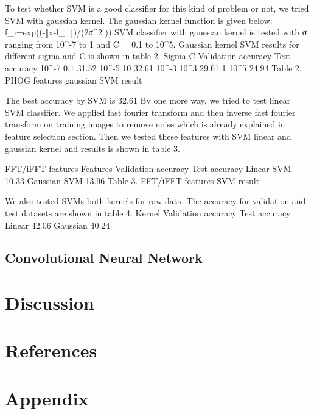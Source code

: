 \documentclass[10pt,twocolumn]{article}
\begin{document}
To test whether SVM is a good classifier for this kind of problem or not, we tried SVM with gaussian kernel. The gaussian kernel function is given below:
f_i=exp⁡((-‖x-l_i ‖)/(2σ^2 ))
\cite {larochelle2007empirical} SVM classifier with gaussian kernel is tested with σ ranging from 10^-7 to 1 and C = 0.1 to 10^5. Gaussian kernel SVM results for different sigma and C is shown in table 2.
Sigma	C	Validation accuracy	Test accuracy
10^-7	0.1	31.52%
10^-5	10	32.61%
10^-3	10^3	29.61%
1	10^5	24.94%
Table 2. PHOG features gaussian SVM result

The best accuracy by SVM is 32.61%
By one more way, we tried to test linear SVM classifier. We applied fast fourier transform and then inverse fast fourier transform on training images to remove noise which is already explained in feature selection section. Then we tested these features with SVM linear and gaussian kernel and results is shown in table 3.

FFT/iFFT features
Features	Validation accuracy	Test accuracy
Linear SVM	10.33%
Gaussian SVM	13.96%
Table 3. FFT/iFFT features SVM result

We also tested SVMs both kernels for raw data. The accuracy for validation and test datasets are shown in table 4.
Kernel	Validation accuracy	Test accuracy
Linear	42.06%
Gaussian	40.24%


\subsection{Convolutional Neural Network}
\section{Discussion}
\section{References}


\section{Appendix}
\end{document}
